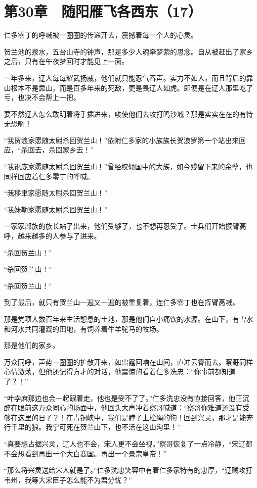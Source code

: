 \section{第30章　随阳雁飞各西东（17）}

仁多零丁的呼喊被一圈圈的传递开去，震撼着每一个人的心灵。

贺兰池的泉水，五台山寺的钟声，那是多少人魂牵梦萦的思念。自从被赶出了家乡之后，只有在午夜梦回时才能见上一面。

一年多来，辽人每每耀武扬威，他们就只能忍气吞声。实力不如人，而且背后的靠山根本不是靠山，而是百多年来的死敌，更是畏辽人如虎。即便是在辽人那里吃了亏，也决不会帮上一把。

要不然辽人怎么敢明着将手插进来，唆使他们去攻打鸣沙城？那是实实在在的有恃无恐啊！

“我贺浪家愿随太尉杀回贺兰山！”依附仁多家的小族族长贺浪罗第一个站出来回应，“杀回去，杀回家乡去！”

“我讹庞家愿随太尉杀回贺兰山！”曾经权倾国中的大族，如今残留下来的余孽，也同样回应着仁多零丁的呼喊。

“我移聿家愿随太尉杀回贺兰山！”

“我妹勒家愿随太尉杀回贺兰山！”

一家家部族的族长站了出来，他们受够了，也不想再忍受了。士兵们开始振臂高呼，越来越多的人参与了进来。

“杀回贺兰山！”

“杀回贺兰山！”

“杀回贺兰山！”

到了最后，就只有贺兰山一遍又一遍的被重复着，连仁多零丁也在挥臂高喊。

那是党项人数百年来生活憩息的土地，那是他们自小痛饮的水源。在山下，有雪水和河水共同灌溉的田地，有饲养着牛羊驼马的牧场。

那是他们的家乡。

万众同呼，声势一圈圈的扩散开来，如雷霆回响在山间，直冲云霄而去。察哥同样心情激荡，但他还记得方才的对话，他震惊的看着仁多洗忠：“你事前都知道了？！”

“叶孛麻那边也会一起跟着走，他也是受不了了。”仁多洗忠没有直接回答，他正沉醉在眼前这万众同心的场面中，他回头大声冲着察哥喊道：“察哥你难道还没有受够在这里的日子？！在青铜峡中，我们是脖子上栓绳的狗！回到兴灵，那才是能奔行千里的狼。我宁可死在贺兰山下，也不活在这山沟里！”

“真要想占据兴灵，辽人也不会，宋人更不会坐视。”察哥恢复了一点冷静，“宋辽都不会想看到再出一个大白髙国。再出一个景宗皇帝！”

“那么将兴灵送给宋人就是了。”仁多洗忠笑容中有着仁多家特有的忠厚，“辽贼攻打韦州，我等大宋臣子怎么能不为君分忧？”

